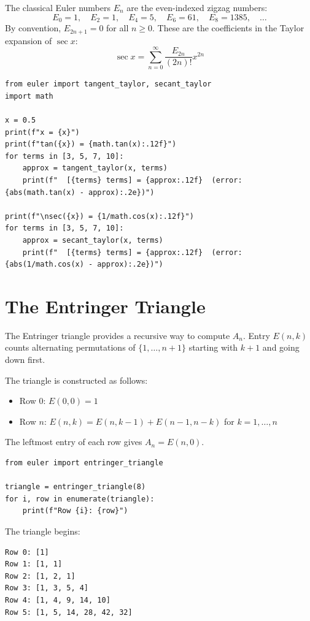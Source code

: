 The classical Euler numbers $E_n$ are the even-indexed zigzag numbers:
\[
E_0 = 1, \quad E_2 = 1, \quad E_4 = 5, \quad E_6 = 61, \quad E_8 = 1385, \quad \ldots
\]
By convention, $E_{2n+1} = 0$ for all $n \geq 0$. These are the coefficients in the
Taylor expansion of $\sec x$:
\[
\sec x = \sum_{n=0}^{\infty} \frac{E_{2n}}{(2n)!} x^{2n}
\]

\begin{lstlisting}[caption={Taylor series for tan(x) and sec(x)}, label=lst:taylor_tan_sec]
from euler import tangent_taylor, secant_taylor
import math

x = 0.5
print(f"x = {x}")
print(f"tan({x}) = {math.tan(x):.12f}")
for terms in [3, 5, 7, 10]:
    approx = tangent_taylor(x, terms)
    print(f"  [{terms} terms] = {approx:.12f}  (error: {abs(math.tan(x) - approx):.2e})")

print(f"\nsec({x}) = {1/math.cos(x):.12f}")
for terms in [3, 5, 7, 10]:
    approx = secant_taylor(x, terms)
    print(f"  [{terms} terms] = {approx:.12f}  (error: {abs(1/math.cos(x) - approx):.2e})")
\end{lstlisting}

\section{The Entringer Triangle}

The Entringer triangle provides a recursive way to compute $A_n$.
Entry $E(n,k)$ counts alternating permutations of $\{1, \ldots, n+1\}$
starting with $k+1$ and going down first.

The triangle is constructed as follows:
\begin{itemize}
    \item Row 0: $E(0,0) = 1$
    \item Row $n$: $E(n,k) = E(n,k-1) + E(n-1,n-k)$ for $k = 1, \ldots, n$
\end{itemize}

The leftmost entry of each row gives $A_n = E(n,0)$.

\begin{lstlisting}[caption={The Entringer triangle}, label=lst:entringer]
from euler import entringer_triangle

triangle = entringer_triangle(8)
for i, row in enumerate(triangle):
    print(f"Row {i}: {row}")
\end{lstlisting}

The triangle begins:
\begin{verbatim}
Row 0: [1]
Row 1: [1, 1]
Row 2: [1, 2, 1]
Row 3: [1, 3, 5, 4]
Row 4: [1, 4, 9, 14, 10]
Row 5: [1, 5, 14, 28, 42, 32]
\end{verbatim}

